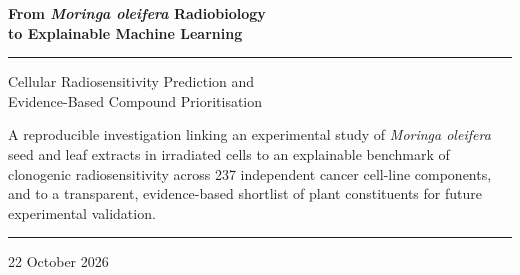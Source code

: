 \begin{titlepage}
  \vspace*{34mm}

  \begin{flushleft}
    {\bfseries\color{reportnavy}\fontsize{26}{32}\selectfont
      From \textit{Moringa oleifera} Radiobiology\\to Explainable Machine Learning\par}
    \vspace{8mm}
    {\color{reportnavy}\rule{0.32\linewidth}{1.2pt}}\par
    \vspace{8mm}
    {\fontsize{15.5}{21}\selectfont\color{reportgrey}
      Cellular Radiosensitivity Prediction and\\
      Evidence-Based Compound Prioritisation\par}
  \end{flushleft}

  \vfill

  \begin{minipage}[b]{0.82\linewidth}
    \small\color{reportgrey}
    A reproducible investigation linking an experimental study of
    \textit{Moringa oleifera} seed and leaf extracts in irradiated cells to an explainable
    benchmark of clonogenic radiosensitivity across 237 independent cancer cell-line
    components, and to a transparent, evidence-based shortlist of plant constituents for
    future experimental validation.
  \end{minipage}

  \vspace{12mm}
  {\color{reportrule}\rule{\linewidth}{0.5pt}}\par\vspace{2mm}
  {\sffamily\small\color{reportgrey}22 October 2026\par}
\end{titlepage}


